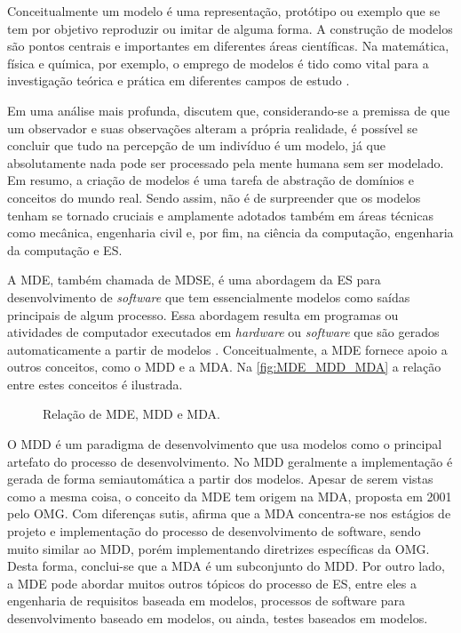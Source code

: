 Conceitualmente um modelo é uma representação, protótipo ou exemplo que se tem por objetivo reproduzir ou imitar de alguma forma. 
A construção de modelos são pontos centrais e importantes em diferentes áreas científicas. 
Na matemática, física e química, por exemplo, o emprego de modelos é tido como vital para a investigação teórica e prática em diferentes campos de estudo \cite{Bailer:2009}.

Em uma análise mais profunda,  discutem que, considerando-se a premissa de que um observador e suas observações alteram a própria realidade, é possível se concluir que tudo na percepção de um indivíduo é um modelo, já que absolutamente nada pode ser processado pela mente humana sem ser modelado. 
Em resumo, a criação de modelos é uma tarefa de abstração de domínios e conceitos do mundo real. %
Sendo assim, não é de surpreender que os modelos tenham se tornado cruciais e amplamente adotados também em áreas técnicas como mecânica, engenharia civil e, por fim, na ciência da computação, engenharia da computação e \ac{ES}.

A \ac{MDE}, também chamada de \ac{MDSE}, é uma abordagem da \ac{ES} para desenvolvimento de \textit{software} que tem essencialmente modelos como saídas principais de algum processo. 
Essa abordagem resulta em programas ou atividades de computador executados em \textit{hardware} ou \textit{software} que são gerados automaticamente a partir de modelos \cite{Sommerville:2011}. 
Conceitualmente, a \ac{MDE} fornece apoio a outros conceitos, como o \ac{MDD} e a \ac{MDA}. Na \autoref{fig:MDE_MDD_MDA} a relação entre estes conceitos é ilustrada.

\begin{figure}[!htb]
    \centering
    \caption{Relação de MDE, MDD e MDA.}
    \label{fig:MDE_MDD_MDA}
    
\end{figure}

O \ac{MDD} é um paradigma de desenvolvimento que usa modelos como o principal artefato do processo de desenvolvimento. 
No \ac{MDD} geralmente a implementação é gerada de forma semiautomática a partir dos modelos. 
Apesar de serem vistas como a mesma coisa, o conceito da \ac{MDE} tem origem na \ac{MDA}, proposta em 2001 pelo \ac{OMG}. 
Com diferenças sutis,  afirma que a \ac{MDA} concentra-se nos estágios de projeto e implementação do processo de desenvolvimento de software, sendo muito similar ao \ac{MDD}, porém implementando diretrizes específicas da \ac{OMG}. 
Desta forma, conclui-se que a \ac{MDA} é um subconjunto do \ac{MDD}. 
Por outro lado, a \ac{MDE} pode abordar muitos outros tópicos do processo de \ac{ES}, entre eles a engenharia de requisitos baseada em modelos, processos de software para desenvolvimento baseado em modelos, ou ainda, testes baseados em modelos.

